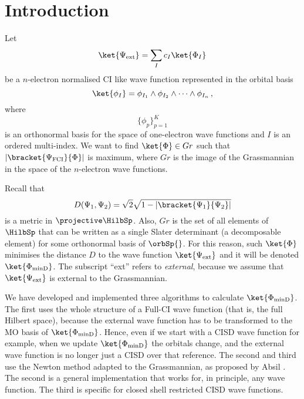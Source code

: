 \documentclass[a4paper,11pt]{article}
\begin{document}
\newpage
\section{Introduction}

Let
\begin{equation}\label{eq:ext_wf}
  \ket{\Psi_\text{ext}} = \sum_I c_I \ket{\Phi_I}
\end{equation}
be a $n$-electron normalised CI like wave function represented in the orbital basis
\begin{equation}
  \ket{\phi_I} = \phi_{I_1} \wedge \phi_{I_2} \wedge \dots \wedge \phi_{I_n}\,,
\end{equation}
where
\begin{equation}
  \{\phi_p\}_{p=1}^K
\end{equation}
is an orthonormal basis for the space of one-electron wave functions and $I$ is an ordered multi-index.
We want to find $\ket{\Phi} \in Gr$ such that $|\bracket{\Psi_\text{FCI}}{\Phi}|$ is maximum, where $Gr$ is the image of the Grassmannian in the space of the $n$-electron wave functions.

Recall that
\begin{equation}
  D(\Psi_1, \Psi_2) = \sqrt{2}\sqrt{1 - |\bracket{\Psi_1}{\Psi_2}|}
\end{equation}
is a metric in $\projective \HilbSp$.\cite{}
Also, $Gr$ is the set of all elements of $\HilbSp$ that can be written as a single Slater determinant (a decomposable element) for some orthonormal basis of $\orbSp{}$.
For this reason, such $\ket{\Phi}$ minimises the distance $D$ to the wave function $\ket{\Psi_\text{ext}}$ and it will be denoted $\ket{\Phi_\text{minD}}$.
The subscript ``ext'' refers to \emph{external}, because we assume that $\ket{\Psi_\text{ext}}$ is external to the Grassmannian.


We have developed and implemented three algorithms to calculate $\ket{\Phi_\text{minD}}$.
The first uses the whole structure of a Full-CI wave function (that is, the full Hilbert space), because the external wave function has to be transformed to the MO basis of $\ket{\Phi_\text{minD}}$.
Hence, even if we start with a CISD wave function for example, when we update $\ket{\Phi_\text{minD}}$ the orbitals change, and the external wave function is no longer just a CISD over that reference.
The second and third use the Newton method adapted to the Grassmannian, as proposed by Absil \etal{} \cite{}.
The second is a general implementation that works for, in principle, any wave function.
The third is specific for closed shell restricted CISD wave functions.
\end{document}
